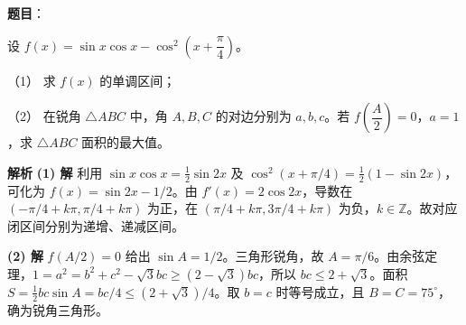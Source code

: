\begin{answer}

\textbf{题目}：

设 $f(x)=\sin x\cos x-\cos^2\left(x+\dfrac{\pi}{4}\right)$。

（1） 求 $f(x)$ 的单调区间；

（2） 在锐角 $\triangle ABC$ 中，角 $A,B,C$ 的对边分别为 $a,b,c$。若 $f\left(\dfrac{A}{2}\right)=0$，$a=1$，求 $\triangle ABC$ 面积的最大值。

\textbf{解析}
\textbf{(1) 解}
利用 $\sin x\cos x=\tfrac12\sin2x$ 及 $\cos^2(x+\pi/4)=\tfrac12(1-\sin2x)$，可化为 $f(x)=\sin2x-1/2$。由 $f'(x)=2\cos2x$，导数在 $(-\pi/4+k\pi,\pi/4+k\pi)$ 为正，在 $(\pi/4+k\pi,3\pi/4+k\pi)$ 为负，$k\in\mathbb Z$。故对应闭区间分别为递增、递减区间。

\textbf{(2) 解}
$f(A/2)=0$ 给出 $\sin A=1/2$。三角形锐角，故 $A=\pi/6$。由余弦定理，$1=a^2=b^2+c^2-\sqrt3bc\ge(2-\sqrt3)bc$，所以 $bc\le2+\sqrt3$。面积 $S=\tfrac12bc\sin A=bc/4\le(2+\sqrt3)/4$。取 $b=c$ 时等号成立，且 $B=C=75^\circ$，确为锐角三角形。



\end{answer}
